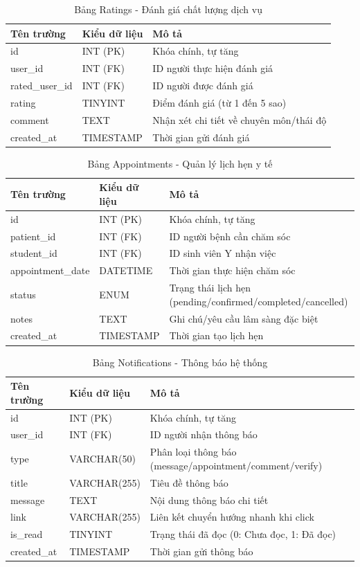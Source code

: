 \documentclass[a4paper,13pt]{extreport}
\begin{document}
\begin{table}[H]
\centering
\caption{Bảng Ratings - Đánh giá chất lượng dịch vụ}
\begin{tabular}{|l|l|l|}
\hline
\textbf{Tên trường} & \textbf{Kiểu dữ liệu} & \textbf{Mô tả} \\
\hline
id & INT (PK) & Khóa chính, tự tăng \\
user\_id & INT (FK) & ID người thực hiện đánh giá \\
rated\_user\_id & INT (FK) & ID người được đánh giá \\
rating & TINYINT & Điểm đánh giá (từ 1 đến 5 sao) \\
comment & TEXT & Nhận xét chi tiết về chuyên môn/thái độ \\
created\_at & TIMESTAMP & Thời gian gửi đánh giá \\
\hline
\end{tabular}
\end{table}

\begin{table}[H]
\centering
\caption{Bảng Appointments - Quản lý lịch hẹn y tế}
\begin{tabular}{|l|l|l|}
\hline
\textbf{Tên trường} & \textbf{Kiểu dữ liệu} & \textbf{Mô tả} \\
\hline
id & INT (PK) & Khóa chính, tự tăng \\
patient\_id & INT (FK) & ID người bệnh cần chăm sóc \\
student\_id & INT (FK) & ID sinh viên Y nhận việc \\
appointment\_date & DATETIME & Thời gian thực hiện chăm sóc \\
status & ENUM & Trạng thái lịch hẹn (pending/confirmed/completed/cancelled) \\
notes & TEXT & Ghi chú/yêu cầu lâm sàng đặc biệt \\
created\_at & TIMESTAMP & Thời gian tạo lịch hẹn \\
\hline
\end{tabular}
\end{table}

\begin{table}[H]
\centering
\caption{Bảng Notifications - Thông báo hệ thống}
\begin{tabular}{|l|l|l|}
\hline
\textbf{Tên trường} & \textbf{Kiểu dữ liệu} & \textbf{Mô tả} \\
\hline
id & INT (PK) & Khóa chính, tự tăng \\
user\_id & INT (FK) & ID người nhận thông báo \\
type & VARCHAR(50) & Phân loại thông báo (message/appointment/comment/verify) \\
title & VARCHAR(255) & Tiêu đề thông báo \\
message & TEXT & Nội dung thông báo chi tiết \\
link & VARCHAR(255) & Liên kết chuyển hướng nhanh khi click \\
is\_read & TINYINT & Trạng thái đã đọc (0: Chưa đọc, 1: Đã đọc) \\
created\_at & TIMESTAMP & Thời gian gửi thông báo \\
\hline
\end{tabular}
\end{table}
\end{document}
